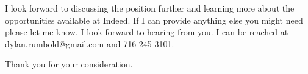 \documentclass[11pt, letterpaper]{awesome-cv}
\begin{document}
\begin{cvletter}
I look forward to discussing the position further and learning more about the opportunities available at Indeed. If I can provide anything else you might need please let me know. I look forward to hearing from you. I can be reached at dylan.rumbold@gmail.com and 716-245-3101.

Thank you for your consideration.



\end{cvletter}


\makeletterclosing
\end{document}
